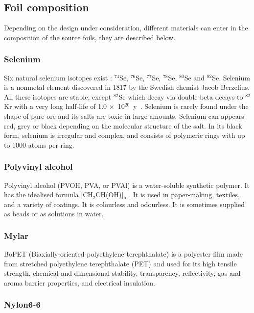 \documentclass[main.tex]{subfiles}
\begin{document}
\subsection{Foil composition}\label{sec:FoilComposition}


\NI Depending on the design under consideration, different materials can enter in the composition of the source foils, they are described below.


\subsubsection{Selenium}


\NI Six natural selenium isotopes exist : $^{\text{74}}$Se, $^{\text{76}}$Se, $^{\text{77}}$Se, $^{\text{78}}$Se, $^{\text{80}}$Se and $^{\text{82}}$Se. Selenium is a nonmetal element discovered in 1817 by the Swedish chemist Jacob Berzelius. All these isotopes are stable, except $^{\text{82}}$Se which decay via double beta decays to $^{\text{82}}$Kr with a very long half-life of 1.0 $\times$~10$^{\text{20}}$~y~\cite{NEMO3:Se82}. Selenium is rarely found under the shape of pure ore and its salts are toxic in large amounts. Selenium can appears red, grey or black depending on the molecular structure of the salt. In its black form, selenium is irregular and complex, and consists of polymeric rings with up to 1000 atoms per ring. 


\subsubsection{Polyvinyl alcohol}


\NI Polyvinyl alcohol (PVOH, PVA, or PVAl) is a water-soluble synthetic polymer. It has the idealised formula [CH$_\text{2}$CH(OH)]$_\text{n}$ . It is used in paper-making, textiles, and a variety of coatings. It is colourless and odourless. It is sometimes supplied as beads or as solutions in water.


\subsubsection{Mylar}


\NI BoPET (Biaxially-oriented polyethylene terephthalate) is a polyester film made from stretched polyethylene terephthalate (PET) and used for its high tensile strength, chemical and dimensional stability, transparency, reflectivity, gas and aroma barrier properties, and electrical insulation.


\subsubsection{Nylon6-6}
\end{document}
